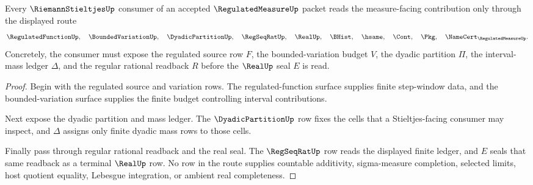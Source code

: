 \begin{theorem}
\label{thm:regulated-measure-stieltjes-handoff}
Every $\RiemannStieltjesUp$ consumer of an accepted $\RegulatedMeasureUp$ packet reads the measure-facing contribution only through the displayed route
$$
\RegulatedFunctionUp,\quad
\BoundedVariationUp,\quad
\DyadicPartitionUp,\quad
\RegSeqRatUp,\quad
\RealUp,\quad
\BHist,\quad
\hsame,\quad
\Cont,\quad
\Pkg,\quad
\NameCert_{\RegulatedMeasureUp}.
$$
Concretely, the consumer must expose the regulated source row $F$, the bounded-variation budget $V$, the dyadic partition $\Pi$, the interval-mass ledger $\Delta$, and the regular rational readback $R$ before the $\RealUp$ seal $E$ is read.
\end{theorem}
\begin{proof}
Begin with the regulated source and variation rows. The regulated-function surface supplies finite step-window data, and the bounded-variation surface supplies the finite budget controlling interval contributions.

Next expose the dyadic partition and mass ledger. The $\DyadicPartitionUp$ row fixes the cells that a Stieltjes-facing consumer may inspect, and $\Delta$ assigns only finite dyadic mass rows to those cells.

Finally pass through regular rational readback and the real seal. The $\RegSeqRatUp$ row reads the displayed finite ledger, and $E$ seals that same readback as a terminal $\RealUp$ row. No row in the route supplies countable additivity, sigma-measure completion, selected limits, host quotient equality, Lebesgue integration, or ambient real completeness.
\end{proof}


\begin{closurestatus}{\RegulatedMeasureUp}
  \theoryclosure{\seedClosure}
  \formalstatus{\unformalizedV}
\end{closurestatus}
